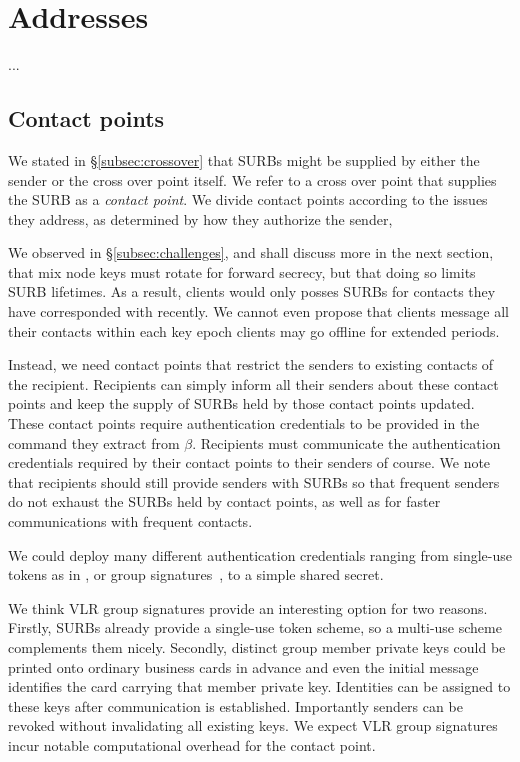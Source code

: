 
\section{Addresses}

...


\subsection{Contact points}

We stated in \S\ref{subsec:crossover} that SURBs might be supplied
by either the sender or the cross over point itself.  We refer to 
a cross over point that supplies the SURB as a {\em contact point}.
We divide contact points according to the issues they address,
as determined by how they authorize the sender,

We observed in \S\ref{subsec:challenges}, and shall discuss more in
the next section, that mix node keys must rotate for forward secrecy,
but that doing so limits SURB lifetimes.  As a result, clients would
only posses SURBs for contacts they have corresponded with recently.
We cannot even propose that clients message all their contacts within
each key epoch clients may go offline for extended periods.

Instead, we need contact points that restrict the senders to existing
contacts of the recipient.  Recipients can simply inform all their
senders about these contact points and keep the supply of SURBs held
by those contact points updated.  These contact points require
authentication credentials to be provided in the command they extract
from $\beta$.  Recipients must communicate the authentication
credentials required by their contact points to their senders of course.
We note that recipients should still provide senders with SURBs so
that frequent senders do not exhaust the SURBs held by contact points,
as well as for faster communications with frequent contacts.

We could deploy many different authentication credentials ranging 
from single-use tokens as in \cite{agl-pond-hmac}, or
 group signatures~\cite{BBS,VLR}, to a simple shared secret.

We think VLR group signatures \cite{VLR} provide an interesting
option for two reasons.  Firstly, SURBs already provide a single-use
token scheme, so a multi-use scheme complements them nicely.  
Secondly, distinct group member private keys could be printed onto
ordinary business cards in advance and even the initial message
identifies the card carrying that member private key.  Identities
can be assigned to these keys after communication is established.  
Importantly senders can be revoked without invalidating all existing
keys.  We expect VLR group signatures incur notable computational
overhead for the contact point.  %


